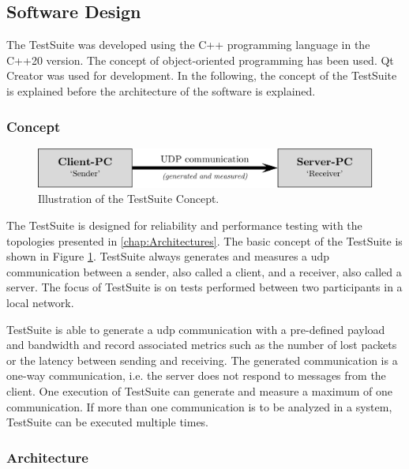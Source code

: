 \subsection{Software Design}
The TestSuite was developed using the C++ programming language in the C++20 version. The concept of object-oriented programming has been used. Qt Creator was used for development. In the following, the concept of the TestSuite is explained before the architecture of the software is explained.

\subsubsection{Concept}

\begin{figure}[h!]
    \centering
    \includegraphics[width=1\linewidth]{figures/method/swdesign1.pdf}
    \caption[Illustration of the TestSuite Concept]{Illustration of the TestSuite Concept.}
    \label{fig:tsconcept}
\end{figure}

The TestSuite is designed for reliability and performance testing with the topologies presented in \ref{chap:Architectures}. The basic concept of the TestSuite is shown in Figure \ref{fig:tsconcept}. TestSuite always generates and measures a \ac{udp} communication between a sender, also called a client, and a receiver, also called a server. The focus of TestSuite is on tests performed between two participants in a local network.

TestSuite is able to generate a \ac{udp} communication with a pre-defined payload and bandwidth and record associated metrics such as the number of lost packets or the latency between sending and receiving. The generated communication is a one-way communication, i.e. the server does not respond to messages from the client. One execution of TestSuite can generate and measure a maximum of one communication. If more than one communication is to be analyzed in a system, TestSuite can be executed multiple times.

\subsubsection{Architecture}

